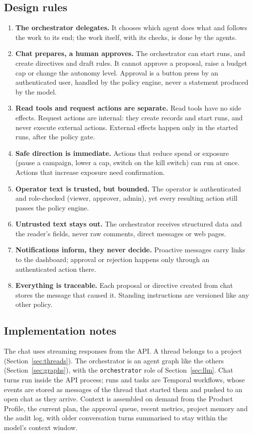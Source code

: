 \documentclass[11pt,a4paper]{article}
\begin{document}
\subsection{Design rules}
\begin{enumerate}
  \item \textbf{The orchestrator delegates.} It chooses which agent does what and follows the work to its end; the work itself, with its checks, is done by the agents.
  \item \textbf{Chat prepares, a human approves.} The orchestrator can start runs, and create directives and draft rules. It cannot approve a proposal, raise a budget cap or change the autonomy level. Approval is a button press by an authenticated user, handled by the policy engine, never a statement produced by the model.
  \item \textbf{Read tools and request actions are separate.} Read tools have no side effects. Request actions are internal: they create records and start runs, and never execute external actions. External effects happen only in the started runs, after the policy gate.
  \item \textbf{Safe direction is immediate.} Actions that reduce spend or exposure (pause a campaign, lower a cap, switch on the kill switch) can run at once. Actions that increase exposure need confirmation.
  \item \textbf{Operator text is trusted, but bounded.} The operator is authenticated and role-checked (viewer, approver, admin), yet every resulting action still passes the policy engine.
  \item \textbf{Untrusted text stays out.} The orchestrator receives structured data and the reader's fields, never raw comments, direct messages or web pages.
  \item \textbf{Notifications inform, they never decide.} Proactive messages carry links to the dashboard; approval or rejection happens only through an authenticated action there.
  \item \textbf{Everything is traceable.} Each proposal or directive created from chat stores the message that caused it. Standing instructions are versioned like any other policy.
\end{enumerate}

\subsection{Implementation notes}
The chat uses streaming responses from the API. A thread belongs to a project (Section~\ref{sec:threads}). The orchestrator is an agent graph like the others (Section~\ref{sec:graphs}), with the \texttt{orchestrator} role of Section~\ref{sec:llm}. Chat turns run inside the API process; runs and tasks are Temporal workflows, whose events are stored as messages of the thread that started them and pushed to an open chat as they arrive. Context is assembled on demand from the Product Profile, the current plan, the approval queue, recent metrics, project memory and the audit log, with older conversation turns summarised to stay within the model's context window.
\end{document}
